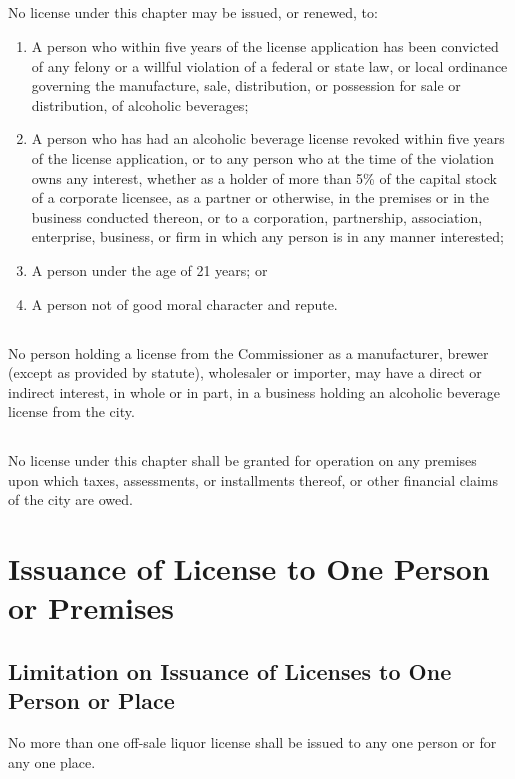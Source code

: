 \subsection{}
No license under this chapter may be issued, or renewed, to:
\begin{enumerate}[{\indent}1)]
    \item A person who within five years of the license application has been convicted of any felony or a willful violation of a federal or state law, or local ordinance governing the manufacture, sale, distribution, or possession for sale or distribution, of alcoholic beverages; 
    \item A person who has had an alcoholic beverage license revoked within five years of the license application, or to any person who at the time of the violation owns any interest, whether as a holder of more than 5\% of the capital stock of a corporate licensee, as a partner or otherwise, in the premises or in the business conducted thereon, or to a corporation, partnership, association, enterprise, business, or firm in which any person is in any manner interested; 
    \item A person under the age of 21 years; or
    \item A person not of good moral character and repute.
\end{enumerate}
\subsection{}
No person holding a license from the Commissioner as a manufacturer, brewer (except as provided by statute), wholesaler or importer, may have a direct or indirect interest, in whole or in part, in a business holding an alcoholic beverage license from the city.
\subsection{}
No license under this chapter shall be granted for operation on any premises upon which taxes, assessments, or installments thereof, or other financial claims of the city are owed.

\section{Issuance of License to One Person or Premises}
\subsection{Limitation on Issuance of Licenses to One Person or Place}
No more than one off-sale liquor license shall be issued to any one person or for any one place.
